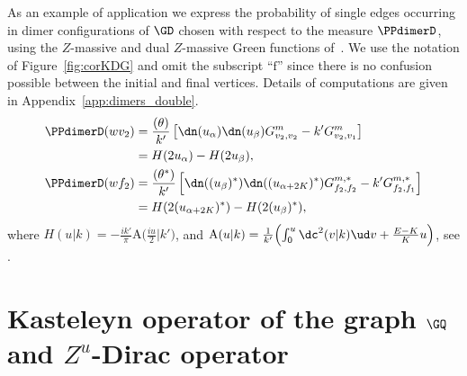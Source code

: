 \documentclass[a4paper,twoside,11pt]{article}
\begin{document}
\begin{exm}\label{ex:Prob_GD} As an example of application we express the probability of single edges occurring in dimer configurations of $\GD$
chosen with respect to the measure $\PPdimerD$, using the $Z$-massive and dual $Z$-massive Green functions of~\cite{BdTR1}. 
We use the notation of Figure~\ref{fig:corKDG} and omit the subscript ``$\mathrm{f}$'' since there is no confusion
possible between the initial and final vertices.
Details of computations are given in Appendix~\ref{app:dimers_double}.
\begin{align*}
\PPdimerD(wv_2)&=\frac{\sc(\theta)}{k'}
\left[\dn(u_{\alpha})\dn(u_{\beta})G^m_{v_2,v_2}-k'G^m_{v_2,v_1}\right]\\
&=H(2u_{\alpha})-H(2u_{\beta}), \\
\PPdimerD(wf_2)&=\frac{\sc(\theta^*)}{k'}
\left[
\dn((u_{\beta})^*)\dn((u_{\alpha+2K})^*)G^{m,*}_{f_2,f_2}-k'G^{m,*}_{f_2,f_1}\right]\\
&=H(2(u_{\alpha+2K})^*)-H(2(u_{\beta})^*),
\end{align*}
where $H(u|k)=-\frac{ik'}{\pi}\mathrm{A}\bigl(\frac{iu}{2}\vert k'\bigr)$, and $\mathrm{A}(u|k)=\frac{1}{k'}\Bigl(\int_0^u \dc^2(v|k)\ud v + \frac{E-K}{K}u\Bigr)$,
see \cite[(9)]{BdTR1}.
\end{exm}








\section{Kasteleyn operator of the graph $\GQ$ and $Z^u$-Dirac operator} \label{sec:GQ_Z_Dirac}
\end{document}
